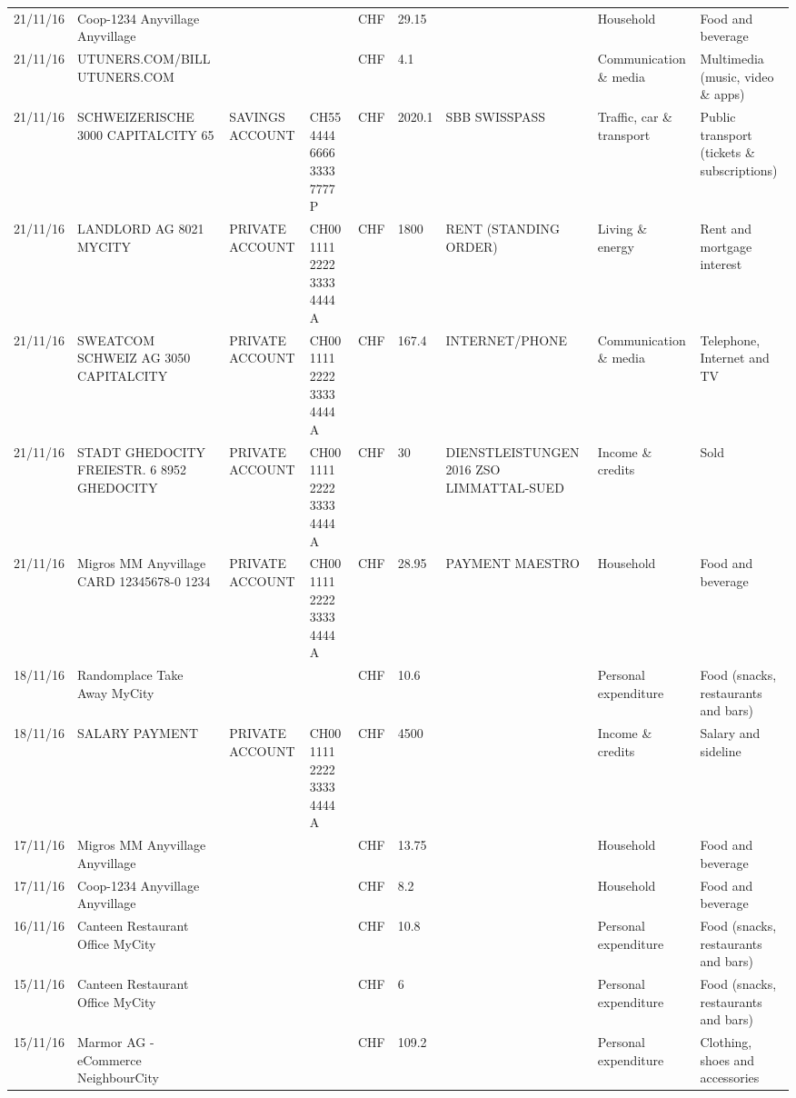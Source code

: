 \begin{landscape}
\begin{table}[t]
\begin{center}
\begin{tabular}{lllllllll}
		21/11/16 & Coop-1234 Anyvillage    Anyvillage &       &       & CHF   & 29.15 &       & Household & Food and beverage \\
		21/11/16 & UTUNERS.COM/BILL          UTUNERS.COM &       &       & CHF   & 4.1   &       & Communication \& media & Multimedia (music, video \& apps) \\
		21/11/16 & SCHWEIZERISCHE 3000 CAPITALCITY 65 & SAVINGS ACCOUNT & CH55 4444 6666 3333 7777 P & CHF   & 2020.1 & SBB SWISSPASS & Traffic, car \& transport & Public transport (tickets \& subscriptions) \\
		21/11/16 & LANDLORD AG 8021 MYCITY & PRIVATE ACCOUNT & CH00 1111 2222 3333 4444 A & CHF   & 1800  & RENT (STANDING ORDER) & Living \& energy & Rent and mortgage interest \\
		21/11/16 & SWEATCOM SCHWEIZ AG 3050 CAPITALCITY & PRIVATE ACCOUNT & CH00 1111 2222 3333 4444 A & CHF   & 167.4 & INTERNET/PHONE & Communication \& media & Telephone,  Internet and TV \\
		21/11/16 & STADT GHEDOCITY FREIESTR. 6 8952 GHEDOCITY & PRIVATE ACCOUNT & CH00 1111 2222 3333 4444 A & CHF   & 30    & DIENSTLEISTUNGEN 2016      ZSO LIMMATTAL-SUED & Income \& credits & Sold \\
		21/11/16 & Migros MM Anyvillage CARD 12345678-0 1234 & PRIVATE ACCOUNT & CH00 1111 2222 3333 4444 A & CHF   & 28.95 & PAYMENT MAESTRO & Household & Food and beverage \\
		18/11/16 & Randomplace Take Away     MyCity &       &       & CHF   & 10.6  &       & Personal expenditure & Food (snacks, restaurants and bars) \\
		18/11/16 & SALARY PAYMENT & PRIVATE ACCOUNT & CH00 1111 2222 3333 4444 A & CHF   & 4500  &       & Income \& credits & Salary and sideline \\
		17/11/16 & Migros MM Anyvillage    Anyvillage &       &       & CHF   & 13.75 &       & Household & Food and beverage \\
		17/11/16 & Coop-1234 Anyvillage    Anyvillage &       &       & CHF   & 8.2   &       & Household & Food and beverage \\
		16/11/16 & Canteen Restaurant Office      MyCity &       &       & CHF   & 10.8  &       & Personal expenditure & Food (snacks, restaurants and bars) \\
		15/11/16 & Canteen Restaurant Office      MyCity &       &       & CHF   & 6     &       & Personal expenditure & Food (snacks, restaurants and bars) \\
		15/11/16 & Marmor AG - eCommerce     NeighbourCity &       &       & CHF   & 109.2 &       & Personal expenditure & Clothing, shoes and accessories \\

\end{tabular}
\end{center}
\end{table}
\end{landscape}
